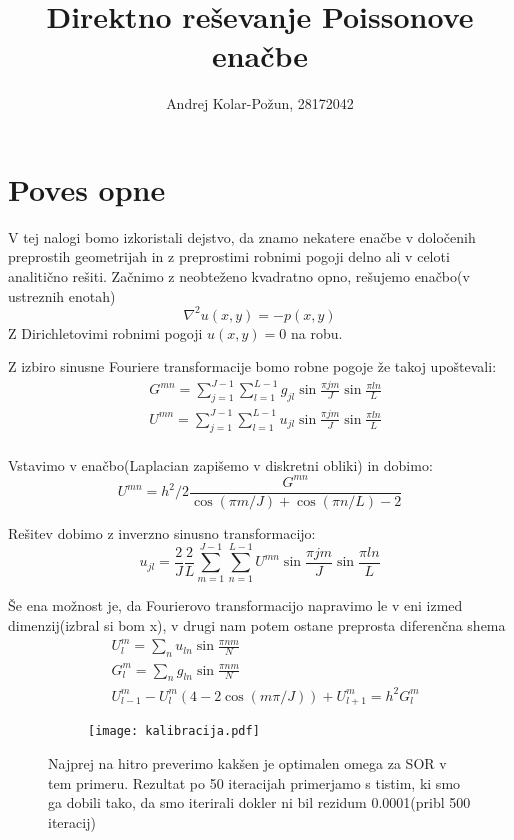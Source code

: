 \documentclass{article}
\title{Direktno reševanje Poissonove enačbe}
\author{Andrej Kolar-Požun, 28172042}
\begin{document}
\maketitle
{}
\section{Poves opne}

V tej nalogi bomo izkoristali dejstvo, da znamo nekatere enačbe v določenih preprostih geometrijah in z preprostimi robnimi pogoji delno ali v celoti analitično rešiti.
Začnimo z neobteženo kvadratno opno, rešujemo enačbo(v ustreznih enotah)
\begin{equation*}
\nabla^2 u(x,y) = -p(x,y)
\end{equation*}
Z Dirichletovimi robnimi pogoji $u(x,y)=0$ na robu.

Z izbiro sinusne Fouriere transformacije bomo robne pogoje že takoj upoštevali:
\begin{align*}
&G^{mn} = \sum_{j=1}^{J-1}\sum_{l=1}^{L-1} g_{jl} \sin \frac{\pi j m}{J} \sin \frac{\pi l n}{L} \\
&U^{mn} = \sum_{j=1}^{J-1}\sum_{l=1}^{L-1} u_{jl} \sin \frac{\pi j m}{J} \sin \frac{\pi l n}{L} \\
\end{align*}

Vstavimo v enačbo(Laplacian zapišemo v diskretni obliki) in dobimo:
\begin{equation*}
U^{mn} = h^2/2 \frac{G^{mn}}{\cos(\pi m/J) + \cos(\pi n / L) - 2}
\end{equation*}

Rešitev dobimo z inverzno sinusno transformacijo:
\begin{equation*}
u_{jl} = \frac{2}{J}\frac{2}{L} \sum_{m=1}^{J-1} \sum_{n=1}^{L-1} U^{mn} \sin \frac{\pi j m}{J} \sin \frac{ \pi l n }{L}
\end{equation*}

Še ena možnost je, da Fourierovo transformacijo napravimo le v eni izmed dimenzij(izbral si bom x), v drugi nam potem ostane preprosta diferenčna shema
\begin{align*}
&U^m_l = \sum_n u_{ln} \sin \frac{\pi n m}{N} \\
&G^m_l = \sum_n g_{ln} \sin \frac{\pi n m}{N} \\
&U_{l-1}^m - U_l^m (4- 2 \cos(m \pi/J)) + U_{l+1}^m = h^2 G_l^m 
\end{align*}

\begin{figure}[H]
\centering
\begin{subfigure}{.5\textwidth}
\texttt{[image: kalibracija.pdf]}
\end{subfigure}
\caption*{Najprej na hitro preverimo kakšen je optimalen omega za SOR v tem primeru. Rezultat po 50 iteracijah primerjamo s tistim, ki smo ga dobili tako, da smo iterirali dokler ni bil rezidum 0.0001(pribl 500 iteracij)}
\end{figure}
\end{document}
